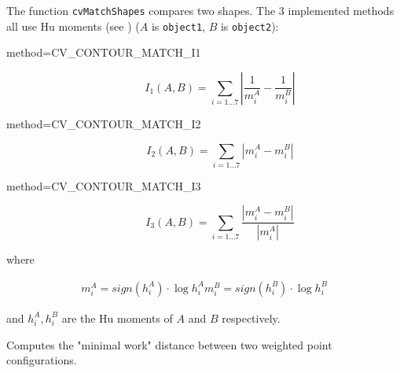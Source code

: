 \begin{description}
\end{description}

The function \texttt{cvMatchShapes} compares two shapes. The 3 implemented methods all use Hu moments (see ) ($A$ is \texttt{object1}, $B$ is \texttt{object2}):

\begin{description}
\item[method=CV\_CONTOUR\_MATCH\_I1]
\[ I_1(A,B) = \sum_{i=1...7} \left| \frac{1}{m^A_i} - \frac{1}{m^B_i} \right| \]

\item[method=CV\_CONTOUR\_MATCH\_I2]
\[ I_2(A,B) = \sum_{i=1...7} \left| m^A_i - m^B_i \right| \]

\item[method=CV\_CONTOUR\_MATCH\_I3]
\[ I_3(A,B) = \sum_{i=1...7} \frac{ \left| m^A_i - m^B_i \right| }{ \left| m^A_i \right| } \]
\end{description}

where

\[
\begin{array}{l}
m^A_i = sign(h^A_i) \cdot \log{h^A_i}
m^B_i = sign(h^B_i) \cdot \log{h^B_i}
\end{array}
\]

and $h^A_i, h^B_i$ are the Hu moments of $A$ and $B$ respectively.

\label{CalcEMD2}

Computes the "minimal work" distance between two weighted point configurations.


